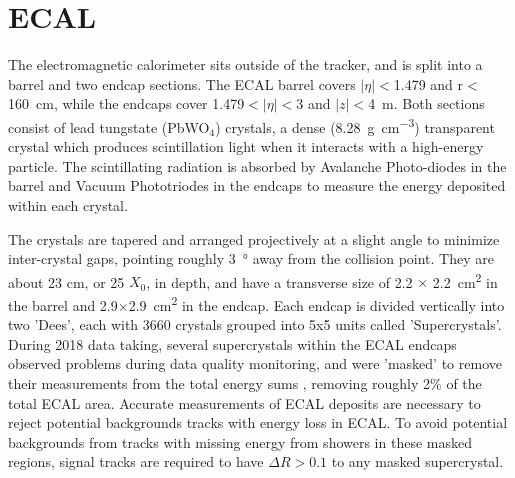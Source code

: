 \section{ECAL}
The electromagnetic calorimeter sits outside of the tracker, and is split into a barrel and two endcap sections. 
The ECAL barrel covers $\lvert\eta\rvert<$1.479 and r$<$\SI{160}{\centi\meter}, while the endcaps cover 1.479$<\lvert\eta\rvert<$3 and $\lvert z \rvert<$\SI{4}{\meter}. 
Both sections consist of lead tungstate (PbWO$_4$) crystals, a dense (\SI{8.28}{\gram\per\cubic\centi\meter}) transparent crystal which produces scintillation light when it interacts with a high-energy particle. 
The scintillating radiation is absorbed by Avalanche Photo-diodes in the barrel and Vacuum Phototriodes in the endcaps to measure the energy deposited within each 
crystal. 

The crystals are tapered and arranged projectively at a slight angle to minimize inter-crystal gaps, pointing roughly \SI{3}{\degree} away from the collision point. 
They are about 23 cm, or 25 $X_0$, in depth, and have a transverse size of 2.2 $\times$ \SI{2.2}{\centi\meter^2} in the barrel and 2.9$\times$\SI{2.9}{\centi\meter^2} in the endcap. 
Each endcap is divided vertically into two 'Dees', each with 3660 crystals grouped into 5x5 units called 'Supercrystals'. 
During 2018 data taking, several supercrystals within the ECAL endcaps observed problems during data quality monitoring, and were 'masked' to remove their measurements from the total energy sums , removing roughly 2$\%$ of the total ECAL area.
Accurate measurements of ECAL deposits are necessary to reject potential backgrounds tracks with energy loss in ECAL.
To avoid potential backgrounds from tracks with missing energy from showers in these masked regions, signal tracks are required to have $\Delta R>0.1$ to any masked supercrystal.

